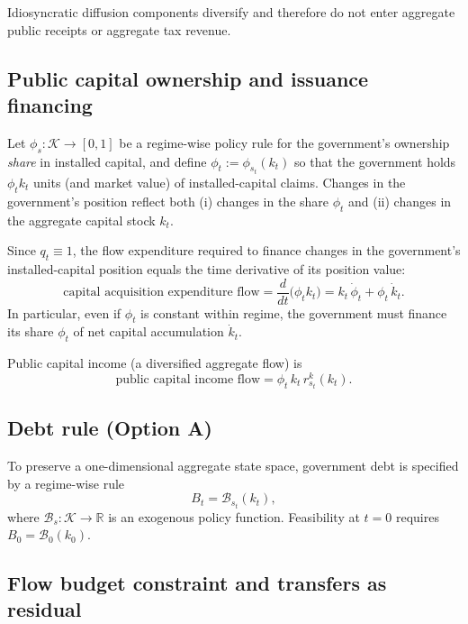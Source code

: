 \documentclass{article}
\begin{document}
Idiosyncratic diffusion components diversify and therefore do not enter aggregate public receipts or aggregate tax revenue.

\subsection{Public capital ownership and issuance financing}

Let $\phi_s:\mathcal K\to[0,1]$ be a regime-wise policy rule for the government's ownership \emph{share} in installed capital,
and define $\phi_t:=\phi_{s_t}(k_t)$ so that the government holds $\phi_t k_t$ units (and market value) of installed-capital claims.
Changes in the government's position reflect both (i) changes in the share $\phi_t$ and (ii) changes in the aggregate capital stock $k_t$.

Since $q_t\equiv 1$, the flow expenditure required to finance changes in the government's installed-capital position equals the time derivative of its position value:
\begin{equation}\label{eq:gov_cap_position_cost}
\text{capital acquisition expenditure flow} = \frac{d}{dt}\big(\phi_t k_t\big)=k_t\,\dot\phi_t+\phi_t\,\dot k_t.
\end{equation}
In particular, even if $\phi_t$ is constant within regime, the government must finance its share $\phi_t$ of net capital accumulation $\dot k_t$.

Public capital income (a diversified aggregate flow) is
\begin{equation}\label{eq:gov_cap_income_updated}
\text{public capital income flow} = \phi_t\,k_t\,r^k_{s_t}(k_t).
\end{equation}

\subsection{Debt rule (Option A)}

To preserve a one-dimensional aggregate state space, government debt is specified by a regime-wise rule
\begin{equation}\label{eq:gov_debt_rule_updated}
B_t = \mathcal B_{s_t}(k_t),
\end{equation}
where $\mathcal B_s:\mathcal K\to\mathbb R$ is an exogenous policy function. Feasibility at $t=0$ requires $B_0=\mathcal B_0(k_0)$.

\subsection{Flow budget constraint and transfers as residual}
\end{document}
